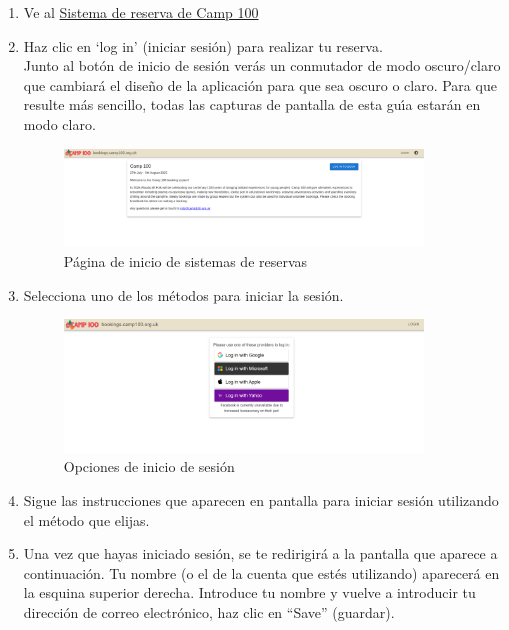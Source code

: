 \documentclass[a4paper, 11pt]{report}
\begin{document}
\begin{enumerate}
    \item Ve al \href{https://bookings.camp100.org.uk}{Sistema de reserva de Camp 100}
    \item Haz clic en `log in' (iniciar sesi\'on) para realizar tu reserva.\\
    Junto al bot\'on de inicio de sesi\'on ver\'as un conmutador de modo oscuro/claro que cambiar\'a el dise\~no de la aplicaci\'on para que sea oscuro o claro. Para que resulte m\'as sencillo, todas las capturas de pantalla de esta gu\'{\i}a estar\'an en modo claro.
    \begin{figure}[H]
        \centering
        \includegraphics[width=0.9\textwidth]{assets/1-homepage.png}
        \caption{P\'agina de inicio de sistemas de reservas}
    \end{figure}
    \item Selecciona uno de los m\'etodos para iniciar la sesi\'on.
    \begin{figure}[H]
        \centering
        \includegraphics[width=0.9\textwidth]{assets/1-login.png}
        \caption{Opciones de inicio de sesi\'on}
    \end{figure}
    \item Sigue las instrucciones que aparecen en pantalla para iniciar sesi\'on utilizando el m\'etodo que elijas.
    \item Una vez que hayas iniciado sesi\'on, se te redirigir\'a a la pantalla que aparece a continuaci\'on. Tu nombre (o el de la cuenta que est\'es utilizando) aparecer\'a en la esquina superior derecha. Introduce tu nombre y vuelve a introducir tu direcci\'on de correo electr\'onico, haz clic en ``Save'' (guardar).
    \begin{figure}[H]

\end{figure}
\end{enumerate}
\end{document}

